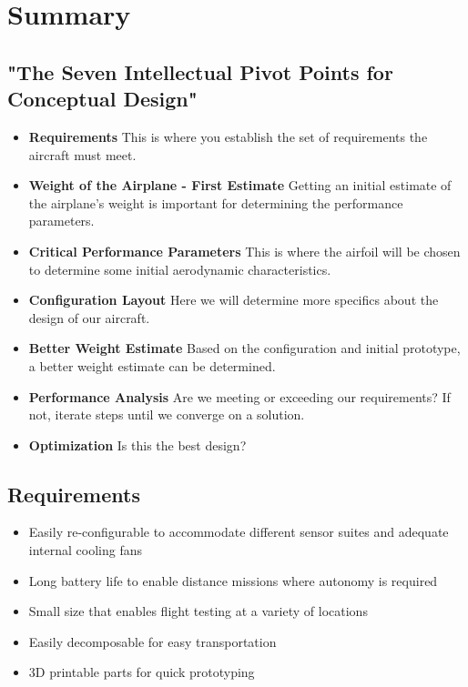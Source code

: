 \documentclass[]{article}
\begin{document}
\section{Summary}
\subsection{"The Seven Intellectual Pivot Points for Conceptual Design"}
\begin{itemize}
\item {\bf Requirements} This is where you establish the set of requirements the aircraft must meet.  

\item {\bf Weight of the Airplane - First Estimate} Getting an initial estimate of the airplane's weight is important for determining the performance parameters.

\item {\bf Critical Performance Parameters}  This is where the airfoil will be chosen to determine some initial aerodynamic characteristics.

\item {\bf Configuration Layout} Here we will determine more specifics about the design of our aircraft. 

\item {\bf Better Weight Estimate} Based on the configuration and initial prototype, a better weight estimate can be determined.  

\item {\bf Performance Analysis} Are we meeting or exceeding our requirements?  If not, iterate steps until we converge on a solution.

\item {\bf Optimization} Is this the best design?
\end{itemize}

\subsection{Requirements}
\begin{itemize}
\item Easily re-configurable to accommodate different sensor suites and adequate internal cooling fans
\item Long battery life to enable distance missions where autonomy is required
\item Small size that enables flight testing at a variety of locations
\item Easily decomposable for easy transportation
\item 3D printable parts for quick prototyping 
\end{itemize}
\end{document}
